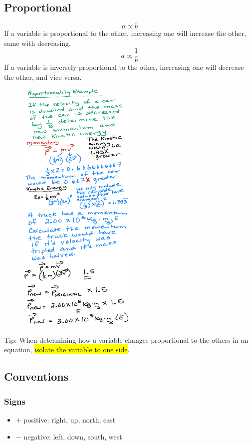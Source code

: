 \documentclass[a4paper,12pt]{article}
\begin{document}
\subsection{Proportional}
\Large $$a \propto b$$ \normalsize
If a variable is proportional to the other, increasing one will increase the other, same with decreasing.
\Large $$a \propto \frac{1}{b}$$ \normalsize
If a variable is inversely proportional to the other, increasing one will decrease the other, and vice versa.
\begin{figure}[H]
    \centering
    \includegraphics[width=0.50\textwidth]{q-prop}
    \includegraphics[width=0.50\textwidth]{q-prop-2}
\end{figure}

Tip: When determining how a variable changes proportional to the others in an equation, \hl{isolate the variable to one side}.

\subsection{Conventions}
\subsubsection{Signs}
\begin{itemize}
    \item{$+$ positive: right, up, north, east}
    \item{$-$ negative: left, down, south, west}
\end{itemize}
\end{document}
